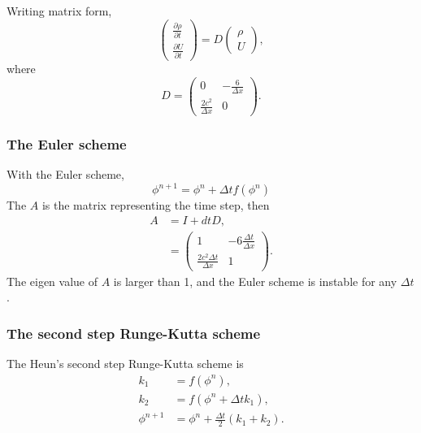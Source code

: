 Writing matrix form,
\begin{equation}
  \begin{pmatrix}
    \frac{\partial \rho}{\partial t} \\
    \frac{\partial U}{\partial t}
  \end{pmatrix}
  = D
  \begin{pmatrix}
    \rho \\
    U
  \end{pmatrix},
\end{equation}
where
\begin{equation}
  D =
  \begin{pmatrix}
    0 & -\frac{6}{\Delta x} \\
    \frac{2c^2}{\Delta x} & 0
  \end{pmatrix}.
\end{equation}

\subsubsection{The Euler scheme}
With the Euler scheme,
\begin{equation}
  \phi^{n+1} = \phi^n + \Delta t f(\phi^n)
\end{equation}
The $A$ is the matrix representing the time step, then
\begin{align}
  A &= I + dt D, \\
    &= \begin{pmatrix}
    1 & -6\frac{\Delta t}{\Delta x} \\
    \frac{2c^2\Delta t}{\Delta x} & 1
    \end{pmatrix}.
\end{align}
The eigen value of $A$ is larger than 1, and the Euler scheme is instable for any $\Delta t$.


\subsubsection{The second step Runge-Kutta scheme}
The Heun's second step Runge-Kutta scheme is
\begin{align}
  k_1 &= f(\phi^n), \\
  k_2 &= f(\phi^n + \Delta t k_1), \\
  \phi^{n+1} &= \phi^n + \frac{\Delta t}{2}(k_1 + k_2).
\end{align}

